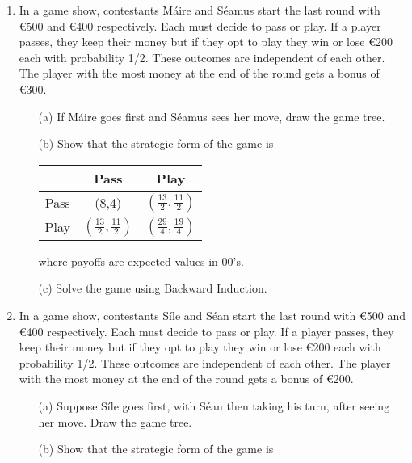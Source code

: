 \documentclass[a4paper,12pt]{article}
\begin{document}
\begin{enumerate}

\item In a game show, contestants M\'{a}ire and S\'{e}amus start the last round with \euro{500} and \euro{400} respectively. Each must decide to pass or play. If a player passes, they keep their money but if they opt to play they win or lose \euro{200} each with probability 1/2. These outcomes are independent of each other. The player with the most money at the end of the round gets a bonus of \euro{300}.

\begin{enumerate}
	\item[(a)] If M\'{a}ire goes first and S\'{e}amus sees her move, draw the game tree. 
	\item[(b)] Show that the strategic form of the game is
	
	\begin{center}
		
		\begin{tabular}{|c|c|c|}
			\hline
			& Pass         &Play       \\
			\hline
			Pass & (8,4) &$\left(\frac{13}{2}, \frac{11}{2}\right)$  \\
			\hline
			Play & $\left(\frac{13}{2}, \frac{11}{2}\right)$& $\left(\frac{29}{4}, \frac{19}{4}\right)$ \\
			\hline
		\end{tabular}
	\end{center}
	where payoffs are expected values in 00's. 
	
	\item[(c)] Solve the game using Backward Induction.
\end{enumerate}

\item  In a game show, contestants S\'{i}le and S\'{e}an start the last round with \euro{500} and \euro{400} respectively. Each must decide to pass or play. If a player passes, they keep their money but if they opt to play they win or lose \euro{200} each with probability 1/2. These outcomes are independent of each other. The player with the most money at the end of the round gets a bonus of \euro{200}.

\begin{enumerate}
	\item[(a)] Suppose S\'{i}le goes first, with S\'{e}an then taking his turn, after seeing her move. Draw the game tree. 
	\item[(b)] Show that the strategic form of the game is
	

\end{enumerate}
\end{enumerate}
\end{document}
